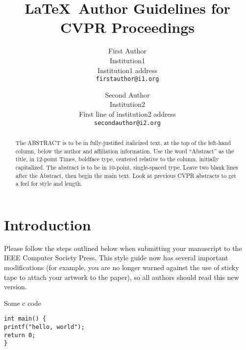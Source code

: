 \documentclass[10pt,twocolumn,letterpaper]{article}
\begin{document}
\title{\LaTeX\ Author Guidelines for CVPR Proceedings}

\author{First Author\\
Institution1\\
Institution1 address\\
{\tt\small firstauthor@i1.org}
\and
Second Author\\
Institution2\\
First line of institution2 address\\
{\tt\small secondauthor@i2.org}
}

\maketitle

\begin{abstract}
   The ABSTRACT is to be in fully-justified italicized text, at the top
   of the left-hand column, below the author and affiliation
   information. Use the word ``Abstract'' as the title, in 12-point
   Times, boldface type, centered relative to the column, initially
   capitalized. The abstract is to be in 10-point, single-spaced type.
   Leave two blank lines after the Abstract, then begin the main text.
   Look at previous CVPR abstracts to get a feel for style and length.
\end{abstract}

\section{Introduction}

Please follow the steps outlined below when submitting your manuscript to
the IEEE Computer Society Press.  This style guide now has several
important modifications (for example, you are no longer warned against the
use of sticky tape to attach your artwork to the paper), so all authors
should read this new version.





Some c code


\begin{verbatim}
int main() {
printf("hello, world");
return 0;
}
\end{verbatim}
\end{document}
